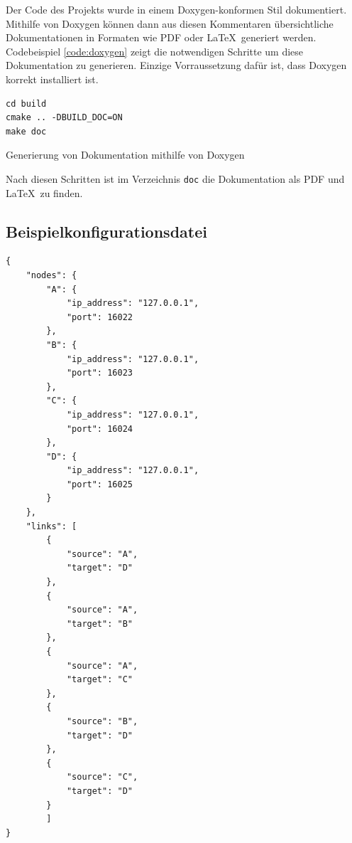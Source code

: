 \documentclass[a4paper,ngerman]{article}
\begin{document}
Der Code des Projekts wurde in einem Doxygen-konformen Stil dokumentiert. Mithilfe von Doxygen können dann aus diesen Kommentaren übersichtliche Dokumentationen in Formaten wie PDF oder \LaTeX\ generiert werden. Codebeispiel \vref{code:doxygen} zeigt die notwendigen Schritte um diese Dokumentation zu generieren. Einzige Vorraussetzung dafür ist, dass Doxygen korrekt installiert ist.

\begin{listing}
\begin{verbatim}
cd build
cmake .. -DBUILD_DOC=ON
make doc
\end{verbatim}

\caption{Generierung von Dokumentation mithilfe von Doxygen}
\label{code:doxygen}
\end{listing}

Nach diesen Schritten ist im Verzeichnis \lstinline{doc} die Dokumentation als PDF und \LaTeX\ zu finden.

\clearpage
\begin{appendix}

\section{Beispielkonfigurationsdatei}
\label{appendix:config}

\begin{verbatim}
{
    "nodes": {
        "A": {
            "ip_address": "127.0.0.1",
            "port": 16022
        },
        "B": {
            "ip_address": "127.0.0.1",
            "port": 16023
        },
        "C": {
            "ip_address": "127.0.0.1",
            "port": 16024
        },
        "D": {
            "ip_address": "127.0.0.1",
            "port": 16025
        }
    },
    "links": [
        {
            "source": "A",
            "target": "D"
        },
        {
            "source": "A",
            "target": "B"
        },
        {
            "source": "A",
            "target": "C"
        },
        {
            "source": "B",
            "target": "D"
        },
        {
            "source": "C",
            "target": "D"
        }
        ]
}
\end{verbatim}

\end{appendix}
\end{document}

